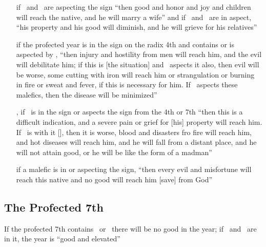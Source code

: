 \begin{itemize}[topsep=0em,itemsep=0em]
\item[\ASC]  if \Jupiter\, and \Venus\, are aspecting the sign ``then good and honor and joy and children will reach the native, and he will marry a wife'' and if \Saturn\, and \Mars\, are in aspect, ``his property and his good will diminish, and he will grieve for his relatives''


\item[\IC] if the profected year is in the sign on the radix 4th and contains or is aspected by \Saturn, ``then injury and hostility from men will reach him, and the evil will debilitate him; if this is [the situation] and \Mars\, aspects it also, then evil will be worse, some cutting with iron will reach him or strangulation or burning in fire or sweat and fever, if this is necessary for him. If \Jupiter\, aspects these malefics, then the disease will be minimized''

\item[\IC,\DSC] if \Saturn\, is in the sign or aspects the sign from the 4th or 7th  ``then this is a difficult indication, and a severe pain or grief for [his] property will reach him. If \Mars\, is with it [\Saturn], then it is worse, blood and disasters fro fire will reach him, and hot diseases will reach him, and he will fall from a distant place, and he will not attain good, or he will be like the form of a madman''

\item[\MC]  if a malefic is in or aspecting the sign, ``then every evil and misfortune will reach this native and no good will reach him [save] from God''
\end{itemize}

\subsection{The Profected 7th}
If the profected 7th contains \Saturn\, or \Mars\, there will be no good in the year; if \Jupiter\, and \Venus\, are in it, the year is ``good and elevated''
